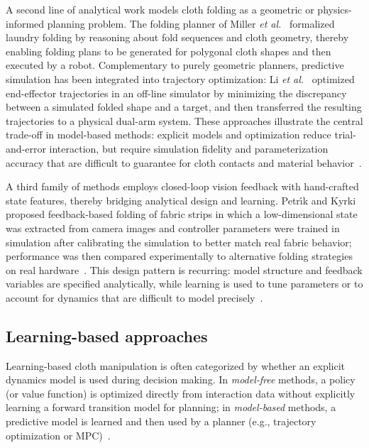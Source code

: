 A second line of analytical work models cloth folding as a geometric or physics-informed planning problem. The folding planner of Miller \emph{et al.}~\cite{Miller2012LaundryFolding} formalized laundry folding by reasoning about fold sequences and cloth geometry, thereby enabling folding plans to be generated for polygonal cloth shapes and then executed by a robot. Complementary to purely geometric planners, predictive simulation has been integrated into trajectory optimization: Li \emph{et al.}~\cite{Li2015PredictiveFolding} optimized end-effector trajectories in an off-line simulator by minimizing the discrepancy between a simulated folded shape and a target, and then transferred the resulting trajectories to a physical dual-arm system. These approaches illustrate the central trade-off in model-based methods: explicit models and optimization reduce trial-and-error interaction, but require simulation fidelity and parameterization accuracy that are difficult to guarantee for cloth contacts and material behavior~\cite{Li2015PredictiveFolding,Longhini2025ClothReview}.

A third family of methods employs closed-loop vision feedback with hand-crafted state features, thereby bridging analytical design and learning. Petr{\'\i}k and Kyrki~\cite{Petrik2019FabricStripFolding} proposed feedback-based folding of fabric strips in which a low-dimensional state was extracted from camera images and controller parameters were trained in simulation after calibrating the simulation to better match real fabric behavior; performance was then compared experimentally to alternative folding strategies on real hardware~\cite{Petrik2019FabricStripFolding}. This design pattern is recurring: model structure and feedback variables are specified analytically, while learning is used to tune parameters or to account for dynamics that are difficult to model precisely~\cite{Longhini2025ClothReview,Petrik2019FabricStripFolding}.

\subsection{Learning-based approaches}

Learning-based cloth manipulation is often categorized by whether an explicit dynamics model is used during decision making. In \emph{model-free} methods, a policy (or value function) is optimized directly from interaction data without explicitly learning a forward transition model for planning; in \emph{model-based} methods, a predictive model is learned and then used by a planner (e.g., trajectory optimization or \ac{MPC})~\cite{Gu2023DeformableSurvey,Longhini2025ClothReview}.

